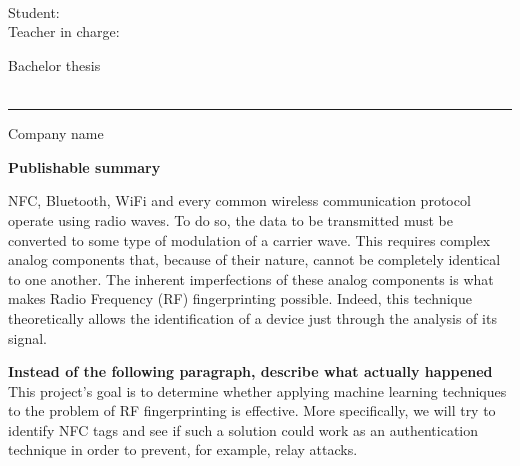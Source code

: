 \begin{flushright}
  \TBdpt\\
  \TBfiliere\\
  \TBorient\\
  Student: \TBauthor\\
  Teacher in charge: \TBsupervisor\\
\end{flushright}

\vspace{0.6cm}

\begin{center}
  {\large Bachelor thesis \TBacademicYears \\[0.2cm]}
  {\TBtitle \\[0.5cm]}
\end{center}

\hrule
\vspace{0.5cm}

{Company name}

\TBindustryName

\vspace{0.5cm}

{\bfseries Publishable summary}

{
  NFC, Bluetooth, WiFi and every common wireless communication protocol operate using radio waves. To do so, the data to be transmitted must be converted to some type of modulation of a carrier wave. This requires complex analog components that, because of their nature, cannot be completely identical to one another. The inherent imperfections of these analog components is what makes Radio Frequency (RF) fingerprinting possible. Indeed, this technique theoretically allows the identification of a device just through the analysis of its signal.

  \textbf{Instead of the following paragraph, describe what actually happened}
  This project's goal is to determine whether applying machine learning techniques to the problem of RF fingerprinting is effective. More specifically, we will try to identify NFC tags and see if such a solution could work as an authentication technique in order to prevent, for example, relay attacks.
}

\vspace{0.5cm}

